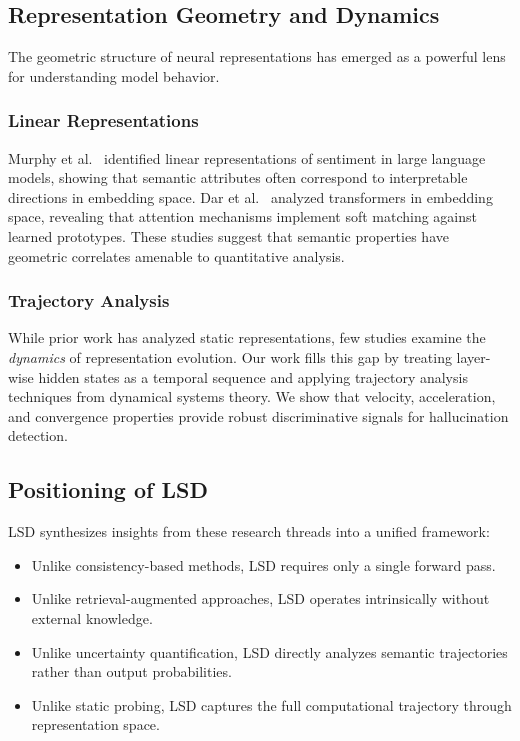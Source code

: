 \documentclass[11pt]{article}
\begin{document}
\subsection{Representation Geometry and Dynamics}

The geometric structure of neural representations has emerged as a powerful lens for understanding model behavior.

\subsubsection{Linear Representations}

Murphy et al.~\cite{murphy2022linear} identified linear representations of sentiment in large language models, showing that semantic attributes often correspond to interpretable directions in embedding space. Dar et al.~\cite{dar2022analyzing} analyzed transformers in embedding space, revealing that attention mechanisms implement soft matching against learned prototypes. These studies suggest that semantic properties have geometric correlates amenable to quantitative analysis.

\subsubsection{Trajectory Analysis}

While prior work has analyzed static representations, few studies examine the \emph{dynamics} of representation evolution. Our work fills this gap by treating layer-wise hidden states as a temporal sequence and applying trajectory analysis techniques from dynamical systems theory. We show that velocity, acceleration, and convergence properties provide robust discriminative signals for hallucination detection.

\subsection{Positioning of LSD}

LSD synthesizes insights from these research threads into a unified framework:
\begin{itemize}[leftmargin=*]
    \item Unlike consistency-based methods, LSD requires only a single forward pass.
    \item Unlike retrieval-augmented approaches, LSD operates intrinsically without external knowledge.
    \item Unlike uncertainty quantification, LSD directly analyzes semantic trajectories rather than output probabilities.
    \item Unlike static probing, LSD captures the full computational trajectory through representation space.
\end{itemize}
\end{document}
